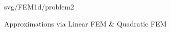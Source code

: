 \begin{figure}[!htbp]
{{				{svg/FEM1d/problem2}}
		}	
		\caption{Approximations via Linear FEM \& Quadratic FEM}
		\label{fig:1D L/Q FEM approximations}
	\end{figure}
	
